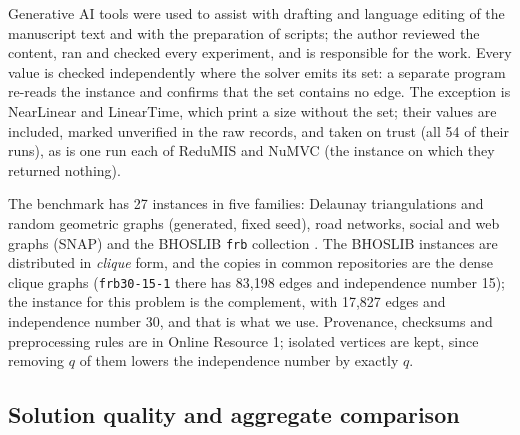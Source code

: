 \documentclass[pdflatex,sn-mathphys-num]{sn-jnl}
\theoremstyle{thmstyleone}%
\theoremstyle{thmstyletwo}%
\begin{document}
Generative AI tools were used to assist with drafting and language editing of the manuscript text and with the preparation of scripts; the author reviewed the content, ran and checked every experiment, and is responsible for the work. Every value is checked independently where the solver emits its set: a separate
program re-reads the instance and confirms that the set contains no edge. The
exception is NearLinear and LinearTime, which print a size without the set; their
values are included, marked unverified in the raw records, and taken on trust (all 54
of their runs), as is one run each of ReduMIS and NuMVC (the instance on which they
returned nothing).

The benchmark has 27 instances in five families: Delaunay triangulations and random
geometric graphs (generated, fixed seed), road networks, social and web graphs (SNAP)
and the BHOSLIB \texttt{frb} collection \citep{xu2007}. The BHOSLIB instances are
distributed in \emph{clique} form, and the copies in common repositories are the
dense clique graphs (\texttt{frb30-15-1} there has 83,198 edges and independence
number 15); the instance for this problem is the complement, with 17,827 edges and
independence number 30, and that is what we use. Provenance, checksums and
preprocessing rules are in Online Resource 1; isolated vertices are kept, since removing
$q$ of them lowers the independence number by exactly $q$.





\subsection{Solution quality and aggregate comparison}
\end{document}
